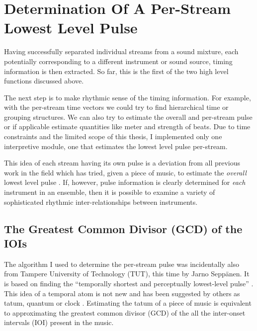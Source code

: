 %
%
\vspace{7mm}
\section{Determination Of A Per-Stream Lowest Level Pulse}
\vspace{3mm}


Having successfully separated individual streams from a sound
mixture, each potentially corresponding to a different instrument or 
sound source, timing information is then extracted. So far, this is 
the first of the two high level functions discussed above. 

The next step is to make rhythmic sense of the timing information.  
For example, with the per-stream time vectors we could try to find 
hierarchical time or grouping structures. We can also try to estimate
the overall and per-stream pulse or if applicable 
estimate quantities like meter and strength of beats. Due to time 
constraints and the limited scope of this thesis, I implemented only 
one interpretive module, one that estimates the lowest level pulse per-stream.

This idea of each stream having its own pulse is a deviation from all
previous work in the field which has tried, given a piece of music, to
estimate the {\it overall} lowest level pulse \cite{Scheirer:98tempo}.
If, however, pulse information is clearly determined for {\it each} 
instrument in an ensemble, then it is possible to examine a variety 
of sophisticated rhythmic inter-relationships between instruments.

\vspace{5mm}
\subsection{The Greatest Common Divisor (GCD) of the IOIs}

The algorithm I used to determine the per-stream pulse was
incidentally also from Tampere University of Technology (TUT), 
this time by Jarno Sepp\"anen. It is based on finding the 
``temporally shortest and perceptually lowest-level pulse''
\cite{Seppanen:99}. This idea of a temporal atom is not new 
and has been suggested by others as tatum, quantum or clock \cite{Seppanen:99}\cite{Bilmes:93}. 
Estimating the tatum of a piece of music is equivalent to approximating the 
greatest common divisor (GCD) of the all the inter-onset intervals (IOI) 
present in the music. 

